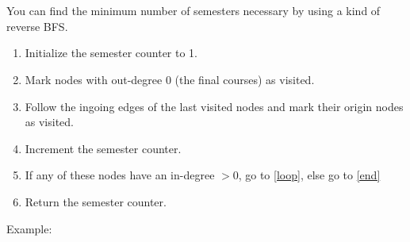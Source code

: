 \documentclass[12pt]{article}
\begin{document}
\section{} %
You can find the minimum number of semesters necessary by using a kind of reverse BFS.

\begin{enumerate}
	\item Initialize the semester counter to 1.
	\item Mark nodes with out-degree 0 (the final courses) as visited.
	\item \label{loop} Follow the ingoing edges of the last visited nodes and mark their origin nodes as visited.
	\item Increment the semester counter.
	\item If any of these nodes have an in-degree $> 0$, go to \ref{loop}, else go to \ref{end}
	\item \label{end} Return the semester counter.
\end{enumerate}

Example:

\end{document}

